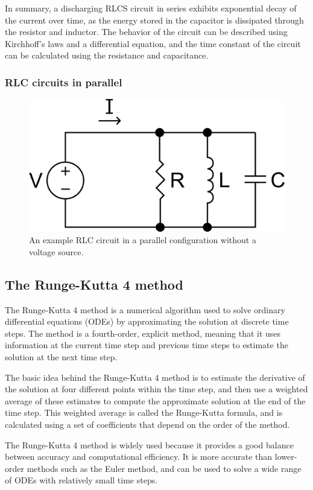 \documentclass[12pt,twoside]{extarticle}
\begin{document}
In summary, a discharging RLCS circuit in series exhibits exponential decay of the current over time, as the energy stored in the capacitor is dissipated through the resistor and inductor. The behavior of the circuit can be described using Kirchhoff's laws and a differential equation, and the time constant of the circuit can be calculated using the resistance and capacitance.


\subsubsection{RLC circuits in parallel}

\begin{figure}[ht]
    \centering
    \includegraphics[width=0.6\columnwidth]{figures/RLC_parallel.png}
    \caption{An example RLC circuit in a parallel configuration without a voltage source.}
    \label{fig:parallelRLC}
\end{figure}


\subsection{The Runge-Kutta 4 method}
\noindent The Runge-Kutta 4 method is a numerical algorithm used to solve ordinary differential equations (ODEs) by approximating the solution at discrete time steps. The method is a fourth-order, explicit method, meaning that it uses information at the current time step and previous time steps to estimate the solution at the next time step.

The basic idea behind the Runge-Kutta 4 method is to estimate the derivative of the solution at four different points within the time step, and then use a weighted average of these estimates to compute the approximate solution at the end of the time step. This weighted average is called the Runge-Kutta formula, and is calculated using a set of coefficients that depend on the order of the method.

The Runge-Kutta 4 method is widely used because it provides a good balance between accuracy and computational efficiency. It is more accurate than lower-order methods such as the Euler method, and can be used to solve a wide range of ODEs with relatively small time steps.
\end{document}
